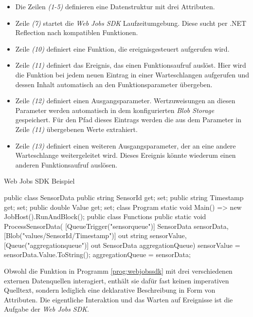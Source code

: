 \begin{itemize}
	\item Die Zeilen \textit{(1-5)} definieren eine Datenstruktur mit drei Attributen.
	\item Zeile \textit{(7)} startet die \textit{Web Jobs SDK} Laufzeitumgebung. Diese sucht per .NET Reflection nach kompatiblen Funktionen.
	\item Zeile \textit{(10)} definiert eine Funktion, die ereignisgesteuert aufgerufen wird.
	\item Zeile \textit{(11)} definiert das Ereignis, das einen Funktionsaufruf auslöst. Hier wird die Funktion bei jedem neuen Eintrag in einer Warteschlangen aufgerufen und dessen Inhalt automatisch an den Funktionsparameter übergeben.
	\item Zeile \textit{(12)} definiert einen Ausgangsparameter. Wertzuweisungen an diesen Parameter werden automatisch in dem konfigurierten \textit{Blob Storage} gespeichert. Für den Pfad dieses Eintrags werden die aus dem Parameter in Zeile \textit{(11)} übergebenen Werte extrahiert.
	\item Zeile \textit{(13)} definiert einen weiteren Ausgangsparameter, der an eine andere Warteschlange weitergeleitet wird. Dieses Ereignis könnte wiederum einen anderen Funktionsaufruf auslösen. 
\end{itemize}

\begin{program}[!hbt]
\caption{Web Jobs SDK Beispiel}
\label{prog:webjobssdk}
\begin{CsCode}
public class SensorData {
  public string SensorId { get; set; }
  public string Timestamp { get; set; }
  public double Value { get; set; }
}
class Program {
  static void Main() => new JobHost().RunAndBlock();
}
public class Functions {
  public static void ProcessSensorData(
    [QueueTrigger("sensorqueue")] SensorData sensorData,
    [Blob("values/{SensorId}/{Timestamp}")] out string sensorValue,
    [Queue("aggregationqueue")] out SensorData aggregationQueue) {
    sensorValue = sensorData.Value.ToString();
    aggregationQueue = sensorData;
  }
}
\end{CsCode}
\end{program}

Obwohl die Funktion in Programm \ref{prog:webjobssdk} mit drei verschiedenen externen Datenquellen interagiert, enthält sie dafür fast keinen imperativen Quelltext, sondern lediglich eine deklarative Beschreibung in Form von Attributen. Die eigentliche Interaktion und das Warten auf Ereignisse ist die Aufgabe der \textit{Web Jobs SDK}. 

